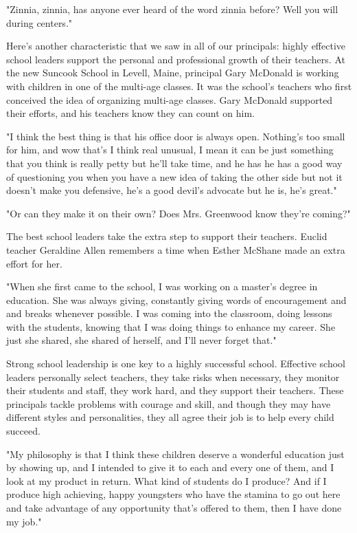 "Zinnia, zinnia, has anyone ever heard of the word zinnia before?
Well you will during centers."

Here's another characteristic that we saw in all of our principals: highly effective school leaders support the personal and professional growth of their teachers.
At the new Suncook School in Levell, Maine, principal Gary McDonald is working with children in one of the multi-age classes.
It was the school's teachers who first conceived the idea of organizing multi-age classes.
Gary McDonald supported their efforts, and his teachers know they can count on him.


"I think the best thing is that his office door is always open.
Nothing's too small for him, and wow that's I think real unusual, I mean it can be just something that you think is really petty but he'll take time, and he has he has a good way of questioning you when you have a new idea of taking the other side but not it doesn't make you defensive, he's a good devil's advocate but he is, he's great."

"Or can they make it on their own?
Does Mrs.
Greenwood know they're coming?"

The best school leaders take the extra step to support their teachers.
Euclid teacher Geraldine Allen remembers a time when Esther McShane made an extra effort for her.

"When she first came to the school, I was working on a master's degree in education.
She was always giving, constantly giving words of encouragement and and breaks whenever possible.
I was coming into the classroom, doing lessons with the students, knowing that I was doing things to enhance my career.
She just she shared, she shared of herself, and I'll never forget that."

Strong school leadership is one key to a highly successful school.
Effective school leaders personally select teachers, they take risks when necessary, they monitor their students and staff, they work hard, and they support their teachers.
These principals tackle problems with courage and skill, and though they may have different styles and personalities, they all agree their job is to help every child succeed.

"My philosophy is that I think these children deserve a wonderful education just by showing up, and I intended to give it to each and every one of them, and I look at my product in return.
What kind of students do I produce?
And if I produce high achieving, happy youngsters who have the stamina to go out here and take advantage of any opportunity that's offered to them, then I have done my job."